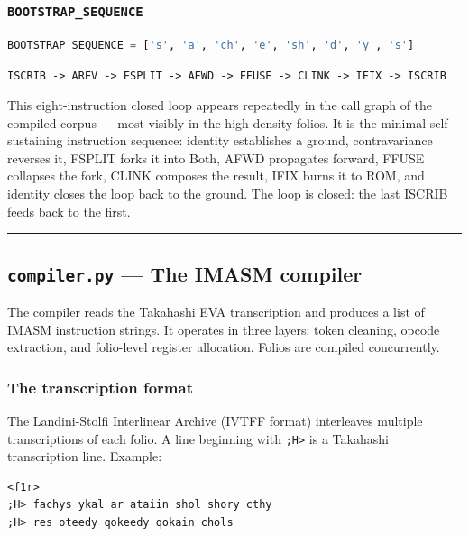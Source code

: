 \documentclass[12pt,a4paper]{article}
\begin{document}
\subsubsection{\texttt{BOOTSTRAP\_SEQUENCE}}

\begin{lstlisting}[language=Python]
BOOTSTRAP_SEQUENCE = ['s', 'a', 'ch', 'e', 'sh', 'd', 'y', 's']
\end{lstlisting}

\texttt{ISCRIB -\textgreater{} AREV -\textgreater{} FSPLIT -\textgreater{} AFWD -\textgreater{} FFUSE -\textgreater{} CLINK -\textgreater{} IFIX -\textgreater{} ISCRIB}

This eight-instruction closed loop appears repeatedly in the call graph of the compiled corpus --- most visibly in the high-density folios. It is the minimal self-sustaining instruction sequence: identity establishes a ground, contravariance reverses it, FSPLIT forks it into Both, AFWD propagates forward, FFUSE collapses the fork, CLINK composes the result, IFIX burns it to ROM, and identity closes the loop back to the ground. The loop is closed: the last ISCRIB feeds back to the first.

\begin{center}
\rule{0.5\textwidth}{0.4pt}
\end{center}

\subsection{\texttt{compiler.py} --- The IMASM compiler}

The compiler reads the Takahashi EVA transcription and produces a list of IMASM instruction strings. It operates in three layers: token cleaning, opcode extraction, and folio-level register allocation. Folios are compiled concurrently.

\subsubsection{The transcription format}

The Landini-Stolfi Interlinear Archive (IVTFF format) interleaves multiple transcriptions of each folio. A line beginning with \texttt{;H\textgreater{}} is a Takahashi transcription line. Example:

\begin{lstlisting}
<f1r>
;H> fachys ykal ar ataiin shol shory cthy
;H> res oteedy qokeedy qokain chols
\end{lstlisting}
\end{document}
